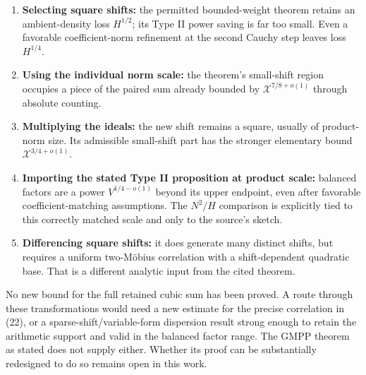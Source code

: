 \begin{enumerate}
\def\labelenumi{\arabic{enumi}.}
\tightlist
\item
  \textbf{Selecting square shifts:} the permitted bounded-weight theorem
  retains an ambient-density loss \(H^{1/2}\); its Type II power saving
  is far too small. Even a favorable coefficient-norm refinement at the
  second Cauchy step leaves loss \(H^{1/4}\).
\item
  \textbf{Using the individual norm scale:} the theorem's small-shift
  region occupies a piece of the paired sum already bounded by
  \(\mathcal X^{7/8+o(1)}\) through absolute counting.
\item
  \textbf{Multiplying the ideals:} the new shift remains a square,
  usually of product-norm size. Its admissible small-shift part has the
  stronger elementary bound \(\mathcal X^{3/4+o(1)}\).
\item
  \textbf{Importing the stated Type II proposition at product scale:}
  balanced factors are a power \(V^{1/4-o(1)}\) beyond its upper
  endpoint, even after favorable coefficient-matching assumptions. The
  \(N^2/H\) comparison is explicitly tied to this correctly matched
  scale and only to the source's sketch.
\item
  \textbf{Differencing square shifts:} it does generate many distinct
  shifts, but requires a uniform two-Möbius correlation with a
  shift-dependent quadratic base. That is a different analytic input
  from the cited theorem.
\end{enumerate}

No new bound for the full retained cubic sum has been proved. A route
through these transformations would need a new estimate for the precise
correlation in (22), or a sparse-shift/variable-form dispersion result
strong enough to retain the arithmetic support and valid in the balanced
factor range. The GMPP theorem as stated does not supply either. Whether
its proof can be substantially redesigned to do so remains open in this
work.
